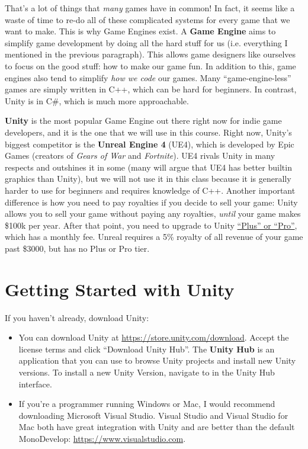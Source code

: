 \documentclass[11pt]{article}
\begin{document}
\par That's a lot of things that {\it many} games have in common!  In fact, it seems like a waste of time to re-do all of these complicated systems for every game that we want to make.  This is why Game Engines exist.  A {\bf Game Engine} aims to simplify game development by doing all the hard stuff for us (i.e. everything I mentioned in the previous paragraph).  This allows game designers like ourselves to focus on the good stuff: how to make our game fun.  In addition to this, game engines also tend to simplify {\it how we code} our games.  Many ``game-engine-less'' games are simply written in C++, which can be hard for beginners.  In contrast, Unity is in C\#, which is much more approachable.


{\bf Unity} is the most popular Game Engine out there right now for indie game developers, and it is the one that we will use in this course.  Right now, Unity's biggest competitor is the {\bf Unreal Engine 4} (UE4), which is developed by Epic Games (creators of {\it Gears of War} and {\it Fortnite}).  UE4 rivals Unity in many respects and outshines it in some (many will argue that UE4 has better builtin graphics than Unity), but we will not use it in this class because it is generally harder to use for beginners and requires knowledge of C++.  Another important difference is how you need to pay royalties if you decide to sell your game: Unity allows you to sell your game without paying any royalties, {\it until} your game makes \$100k per year.  After that point, you need to upgrade to Unity \href{https://store.unity.com}{``Plus'' or ``Pro''}, which has a monthly fee.  Unreal requires a 5\% royalty of all revenue of your game past \$3000, but has no Plus or Pro tier.

\section{Getting Started with Unity}

If you haven't already, download Unity:
\begin{itemize}
\item You can download Unity at \href{https://store.unity.com/download}{https://store.unity.com/download}.  Accept the license terms and click ``Download Unity Hub''.  The {\bf Unity Hub} is an application that you can use to browse Unity projects and install new Unity versions.  To install a new Unity Version, navigate to  in the Unity Hub interface.
\item If you're a programmer running Windows or Mac, I would recommend downloading Microsoft Visual Studio.  Visual Studio and Visual Studio for Mac both have great integration with Unity and are better than the default MonoDevelop: \href{https://www.visualstudio.com}{https://www.visualstudio.com}.
\end{itemize}
\end{document}
